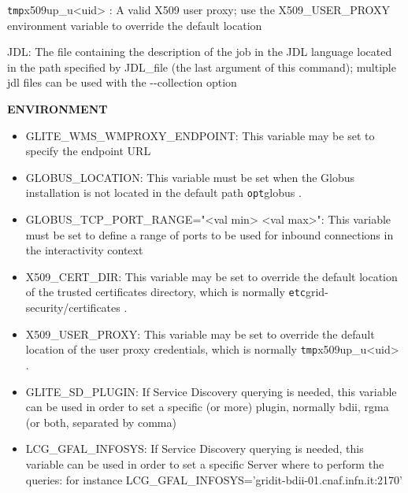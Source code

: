 \verb /tmp/x509up_u<uid> {}: A valid X509 user proxy; 
use the X509\_USER\_PROXY environment variable to override the default location

JDL: The file containing the description of the job in the JDL language located in the
 path specified by JDL\_file (the last argument of this command); multiple jdl files can be 
used with the -{}-collection option


\medskip
\textbf{ENVIRONMENT}
\smallskip


\begin{itemize}



\item GLITE\_WMS\_WMPROXY\_ENDPOINT: This variable may be set to specify the endpoint URL


\item GLOBUS\_LOCATION: This variable must be set when the Globus installation is not located in the default path \verb /opt/globus {}.


\item GLOBUS\_TCP\_PORT\_RANGE="<val min> <val max>": This variable must be set to define a range of ports to be used for inbound connections in the interactivity context


\item X509\_CERT\_DIR: This variable may be set to override the default location of the trusted certificates directory, which is normally \verb /etc/grid-security/certificates {}.


\item X509\_USER\_PROXY: This variable may be set to override the default location of the user proxy credentials, which is normally \verb /tmp/x509up_u<uid> {}.


\item GLITE\_SD\_PLUGIN: If Service Discovery querying is needed, this variable can be used in order to set a specific (or more) plugin, normally bdii, rgma (or both, separated by comma)


\item LCG\_GFAL\_INFOSYS: If Service Discovery querying is needed, this variable can be used in order to set a specific Server where to perform the queries: for instance LCG\_GFAL\_INFOSYS='gridit-bdii-01.cnaf.infn.it:2170'


\end{itemize}


